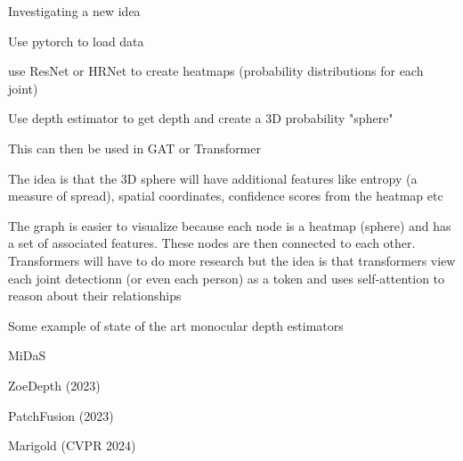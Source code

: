 Investigating a new idea

\begin{compactitem}
	\item Use pytorch to load data
	\item use ResNet or HRNet to create heatmaps (probability distributions for each joint)
	\item Use depth estimator to get depth and create a 3D probability "sphere"
	\item This can then be used in GAT or Transformer
\end{compactitem}

The idea is that the 3D sphere will have additional features like entropy (a measure of spread),
spatial coordinates, confidence scores from the heatmap etc

The graph is easier to visualize because each node is a heatmap (sphere) and has a set of associated
features. These nodes are then connected to each other. Transformers will have to do more research
but the idea is that transformers view each joint detectionn (or even each person) as a token and uses
self-attention to reason about their relationships

Some example of state of the art monocular depth estimators

\begin{compactitem}
	\item MiDaS
	\item ZoeDepth (2023)
	\item PatchFusion (2023)
	\item Marigold (CVPR 2024)
\end{compactitem}


